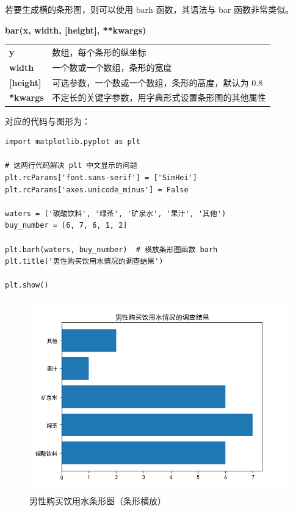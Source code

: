 若要生成横的条形图，则可以使用 barh 函数，其语法与 bar 函数非常类似。

\begin{center}
\begin{tcolorbox}[title = barh 函数的语法]
\textbf{bar(x, width, [height], **kwargs)}
\tcblower
\vspace{10pt}

\begin{tcboutputlisting}
\begin{tabular}{>{\bfseries}ll}
    y &数组，每个条形的纵坐标\\
    width & 一个数或一个数组，条形的宽度\\

  [height] &可选参数，一个数或一个数组，条形的高度，默认为 0.8\\

**kwargs &不定长的关键字参数，用字典形式设置条形图的其他属性
\end{tabular}
\end{tcboutputlisting}
\tcbuselistingtext
\end{tcolorbox}
\end{center}

对应的代码与图形为：

\begin{lstlisting}[Language=Python]
import matplotlib.pyplot as plt

# 这两行代码解决 plt 中文显示的问题
plt.rcParams['font.sans-serif'] = ['SimHei']
plt.rcParams['axes.unicode_minus'] = False

waters = ('碳酸饮料', '绿茶', '矿泉水', '果汁', '其他')
buy_number = [6, 7, 6, 1, 2]

plt.barh(waters, buy_number)  # 横放条形图函数 barh
plt.title('男性购买饮用水情况的调查结果')

plt.show()
\end{lstlisting}

\begin{figure}[!ht]
  \centering
  \includegraphics[scale=0.9]{figure/bar2.png}
  \caption{男性购买饮用水条形图（条形横放）}\label{fig:bar2}
\end{figure}



